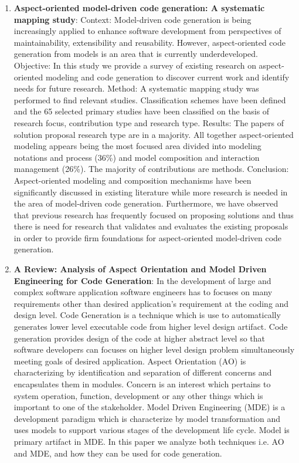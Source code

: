 \begin{englishtext}
\begin{enumerate}
    \item \textbf{Aspect-oriented model-driven code generation: A systematic
    mapping study}: Context: Model-driven code generation is being increasingly
    applied to enhance software development from perspectives of
    maintainability, extensibility and reusability. However, aspect-oriented
    code generation from models is an area that is currently underdeveloped.
    Objective: In this study we provide a survey of existing research on
    aspect-oriented modeling and code generation to discover current work and
    identify needs for future research. Method: A systematic mapping study was
    performed to find relevant studies. Classification schemes have been defined
    and the 65 selected primary studies have been classified on the basis of
    research focus, contribution type and research type. Results: The papers of
    solution proposal research type are in a majority. All together
    aspect-oriented modeling appears being the most focused area divided into
    modeling notations and process (36\%) and model composition and interaction
    management (26\%). The majority of contributions are methods. Conclusion:
    Aspect-oriented modeling and composition mechanisms have been significantly
    discussed in existing literature while more research is needed in the area
    of model-driven code generation. Furthermore, we have observed that previous
    research has frequently focused on proposing solutions and thus there is
    need for research that validates and evaluates the existing proposals in
    order to provide firm foundations for aspect-oriented model-driven code
    generation. \cite{aspectOriented}

    \item \textbf{A Review: Analysis of Aspect Orientation and Model Driven
    Engineering for Code Generation}: In the development of large and complex
    software application software engineers has to focuses on many requirements
    other than desired application’s requirement at the coding and design level.
    Code Generation is a technique which is use to automatically generates lower
    level executable code from higher level design artifact. Code generation
    provides design of the code at higher abstract level so that software
    developers can focuses on higher level design problem simultaneously meeting
    goals of desired application. Aspect Orientation (AO) is characterizing by
    identification and separation of different concerns and encapsulates them in
    modules. Concern is an interest which pertains to system operation,
    function, development or any other things which is important to one of the
    stakeholder. Model Driven Engineering (MDE) is a development paradigm which
    is characterize by model transformation and uses models to support various
    stages of the development life cycle. Model is primary artifact in MDE. In
    this paper we analyze both techniques i.e. AO and MDE, and how they can be
    used for code generation. \cite{aspectOrientationReview}


\end{enumerate}
\end{englishtext}
